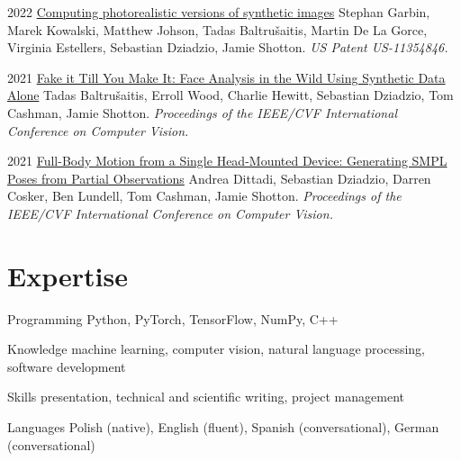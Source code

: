 \documentclass[]{friggeri-cv_osx}
\begin{document}
\entry
{2022}
{\href{https://scholar.google.com/citations?user=8vAIQXoAAAAJ&hl=en}{Computing photorealistic versions of synthetic images}}
{}
{Stephan Garbin, Marek Kowalski, Matthew Johson, Tadas Baltru\v{s}aitis, Martin De La Gorce, Virginia Estellers, Sebastian Dziadzio, Jamie Shotton.
\textit{US Patent US-11354846.}\\}

\entry
{2021}
{\href{https://scholar.google.com/citations?user=8vAIQXoAAAAJ&hl=en}{Fake it Till You Make It: Face Analysis in the Wild Using Synthetic Data Alone}}
{}
{Tadas Baltru\v{s}aitis, Erroll Wood, Charlie Hewitt, Sebastian Dziadzio, Tom Cashman, Jamie Shotton.
\textit{Proceedings of the IEEE/CVF International Conference on Computer Vision.}\\}

\entry
{2021}
{\href{https://scholar.google.com/citations?user=8vAIQXoAAAAJ&hl=en}{Full-Body Motion from a Single Head-Mounted Device: Generating SMPL Poses from Partial Observations}}
{}
{Andrea Dittadi, Sebastian Dziadzio, Darren Cosker, Ben Lundell, Tom Cashman, Jamie Shotton.
\textit{Proceedings of the IEEE/CVF International Conference on Computer Vision.}\\}

\section{Expertise}
\begin{entrylist}
\entry
{}
{Programming}
{}
{Python, PyTorch, TensorFlow, NumPy, C++}

\entry
{}
{Knowledge}
{}
{machine learning, computer vision, natural language processing, software development}

\entry
{}
{Skills}
{}
{presentation, technical and scientific writing, project management}

\entry
{}
{Languages}
{}
{Polish (native), English (fluent), Spanish (conversational), German (conversational)}
\end{entrylist}
\end{document}
